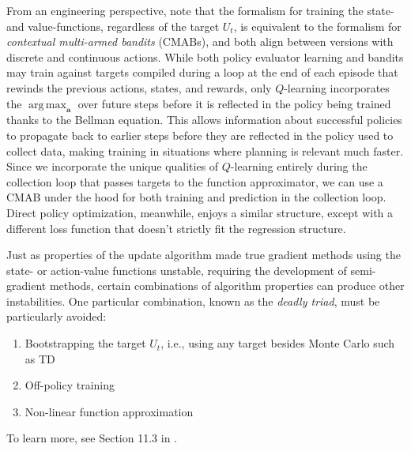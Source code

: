 \documentclass{article}
\DeclareMathOperator*{\argmax}{arg\,max}
\begin{document}
From an engineering perspective, note that the formalism for training the state- and value-functions, regardless of the target $U_t$, is equivalent to the formalism for \textit{contextual multi-armed bandits} (CMABs), and both align between versions with discrete and continuous actions. While both policy evaluator learning and bandits may train against targets compiled during a loop at the end of each episode that rewinds the previous actions, states, and rewards, only $Q$-learning incorporates the $\argmax_\mathbf{a}$ over future steps before it is reflected in the policy being trained thanks to the Bellman equation. This allows information about successful policies to propagate back to earlier steps before they are reflected in the policy used to collect data, making training in situations where planning is relevant much faster. Since we incorporate the unique qualities of $Q$-learning entirely during the collection loop that passes targets to the function approximator, we can use a CMAB under the hood for both training and prediction in the collection loop.  Direct policy optimization, meanwhile, enjoys a similar structure, except with a different loss function that doesn't strictly fit the regression structure.

Just as properties of the update algorithm made true gradient methods using the state- or action-value functions unstable, requiring the development of semi-gradient methods, certain combinations of algorithm properties can produce other instabilities. One particular combination, known as the \textit{deadly triad}, must be particularly avoided:
\begin{enumerate}
\item Bootstrapping the target $U_t$, i.e., using any target besides Monte Carlo such as TD
\item Off-policy training
\item Non-linear function approximation
\end{enumerate}
To learn more, see Section 11.3 in \cite{sutton_barto_rl}.
\end{document}

